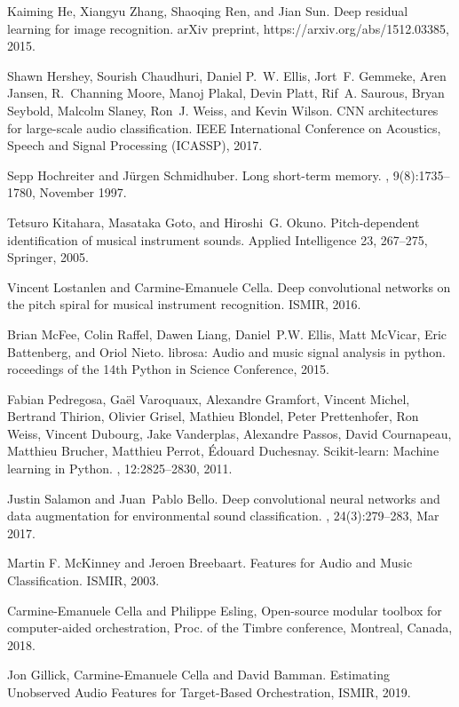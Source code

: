 \documentclass{article}
\begin{document}
\begin{thebibliography}{99}
Kaiming He, Xiangyu Zhang, Shaoqing Ren, and Jian Sun.
\newblock Deep residual learning for image recognition.
\newblock arXiv preprint, https://arxiv.org/abs/1512.03385, 2015.

Shawn Hershey, Sourish Chaudhuri, Daniel P.~W. Ellis, Jort~F. Gemmeke, Aren
  Jansen, R.~Channing Moore, Manoj Plakal, Devin Platt, Rif~A. Saurous, Bryan
  Seybold, Malcolm Slaney, Ron~J. Weiss, and Kevin Wilson.
\newblock CNN architectures for large-scale audio classification.
\newblock IEEE International Conference on Acoustics, Speech and Signal Processing (ICASSP), 2017.

Sepp Hochreiter and J\"{u}rgen Schmidhuber.
\newblock Long short-term memory.
, 9(8):1735–1780, November 1997.

Tetsuro Kitahara, Masataka Goto, and Hiroshi~G. Okuno.
\newblock Pitch-dependent identification of musical instrument sounds.
\newblock Applied Intelligence 23, 267–275, Springer, 2005.

Vincent Lostanlen and Carmine-Emanuele Cella.
\newblock Deep convolutional networks on the pitch spiral for musical
  instrument recognition. ISMIR, 2016.

Brian McFee, Colin Raffel, Dawen Liang, Daniel~P.W. Ellis, Matt McVicar, Eric
  Battenberg, and Oriol Nieto.
\newblock librosa: Audio and music signal analysis in python.
roceedings of the 14th {P}ython in {S}cience {C}onference, 2015.

Fabian Pedregosa, Ga\"el Varoquaux, Alexandre
Gramfort, Vincent Michel, Bertrand Thirion, Olivier
Grisel, Mathieu Blondel, Peter Prettenhofer, Ron
Weiss, Vincent Dubourg, Jake Vanderplas, Alexandre
Passos, David Cournapeau, Matthieu Brucher,
Matthieu Perrot, \'Edouard Duchesnay.
\newblock Scikit-learn: Machine learning in {P}ython.
, 12:2825--2830, 2011.

Justin Salamon and Juan~Pablo Bello.
\newblock Deep convolutional neural networks and data augmentation for
  environmental sound classification.
, 24(3):279–283, Mar 2017.

Martin F. McKinney and Jeroen Breebaart.
\newblock Features for Audio and Music Classification.
\newblock ISMIR, 2003.

Carmine-Emanuele Cella and Philippe Esling, {Open-source modular toolbox for computer-aided orchestration}, Proc. of the Timbre conference, Montreal, Canada, 2018.

Jon Gillick, Carmine-Emanuele Cella and David Bamman. {Estimating Unobserved Audio Features for Target-Based Orchestration}, ISMIR, 2019.

\end{thebibliography}
\end{document}

